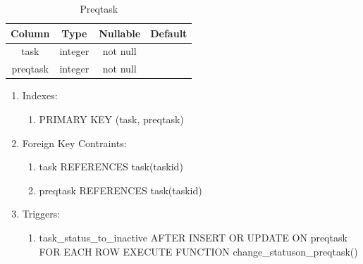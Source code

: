 \documentclass[conference]{IEEEtran}
\begin{document}
\begin{table}[htbp]
  \caption{Preqtask}
  \begin{center}
    \begin{tabular}{|c|c|c|c|}
      \hline
      \textbf{Column} & \textbf{Type} & \textbf{Nullable} & \textbf{Default}\\
      \hline
      task & integer & not null &\\
      preqtask & integer & not null &\\
      \hline
    \end{tabular}
    \begin{enumerate}
    \item Indexes:
      \begin{enumerate}
      \item PRIMARY KEY (task, preqtask)
      \end{enumerate}
    \item Foreign Key Contraints:
      \begin{enumerate}
      \item task REFERENCES task(taskid)
      \item preqtask REFERENCES task(taskid)
      \end{enumerate}
    \item Triggers:
      \begin{enumerate}
        \item task\_status\_to\_inactive AFTER INSERT OR UPDATE ON preqtask FOR EACH ROW EXECUTE FUNCTION change\_statuson\_preqtask()
      \end{enumerate}
    \end{enumerate}
    \label{preqtask}
  \end{center}
\end{table}
\end{document}
